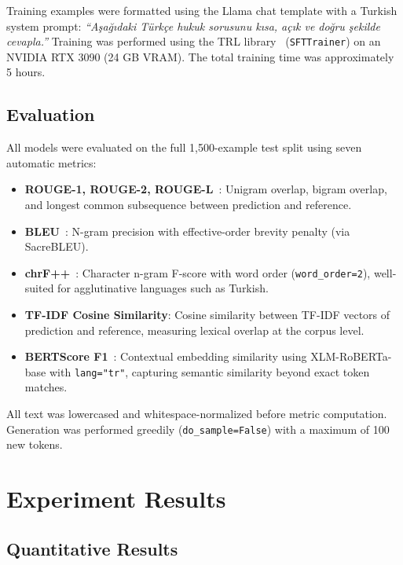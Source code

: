 \documentclass[conference]{IEEEtran}
\begin{document}
Training examples were formatted using the Llama chat template with a Turkish system prompt:
\textit{``Aşağıdaki Türkçe hukuk sorusunu kısa, açık ve doğru şekilde cevapla.''} Training
was performed using the TRL library~\cite{vonwerra2022trl} (\texttt{SFTTrainer}) on an
NVIDIA RTX 3090 (24 GB VRAM). The total training time was approximately 5 hours.

\subsection{Evaluation}

All models were evaluated on the full 1,500-example test split using seven automatic metrics:

\begin{itemize}
  \item \textbf{ROUGE-1, ROUGE-2, ROUGE-L}~\cite{lin2004rouge}: Unigram overlap, bigram
    overlap, and longest common subsequence between prediction and reference.
  \item \textbf{BLEU}~\cite{papineni2002bleu}: N-gram precision with effective-order
    brevity penalty (via SacreBLEU).
  \item \textbf{chrF++}~\cite{popovic2017chrf}: Character n-gram F-score with word order
    (\texttt{word\_order=2}), well-suited for agglutinative languages such as Turkish.
  \item \textbf{TF-IDF Cosine Similarity}: Cosine similarity between TF-IDF vectors of
    prediction and reference, measuring lexical overlap at the corpus level.
  \item \textbf{BERTScore F1}~\cite{zhang2020bertscore}: Contextual embedding similarity
    using XLM-RoBERTa-base with \texttt{lang="tr"}, capturing semantic similarity beyond
    exact token matches.
\end{itemize}

All text was lowercased and whitespace-normalized before metric computation. Generation was
performed greedily (\texttt{do\_sample=False}) with a maximum of 100 new tokens.

\section{Experiment Results}

\subsection{Quantitative Results}
\end{document}
